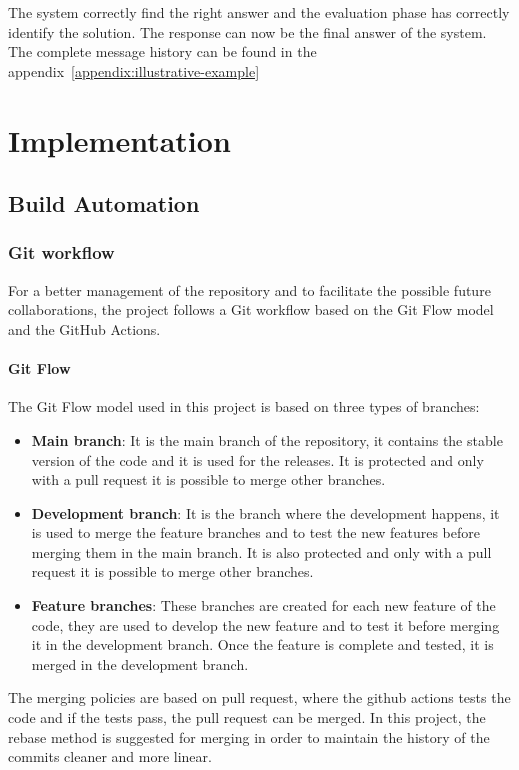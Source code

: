 \documentclass[12pt,a4paper,openright,twoside]{book}
\begin{document}
The system correctly find the right answer and the evaluation phase has correctly identify the solution. The response can now be the final answer of the system.
The complete message history can be found in the appendix~\ref{appendix:illustrative-example}

\chapter{Implementation}
\label{chap:implementation}
\section{Build Automation}
\subsection{Git workflow}
For a better management of the repository and to facilitate the possible future collaborations, the project follows a Git workflow based on the Git Flow model and the GitHub Actions. 
\subsubsection{Git Flow}
The Git Flow model used in this project is based on three types of branches:
\begin{itemize}
    \item \textbf{Main branch}: It is the main branch of the repository, it contains the stable version of the code and it is used for the releases. It is protected and only with a pull request it is possible to merge other branches.
    \item \textbf{Development branch}: It is the branch where the development happens, it is used to merge the feature branches and to test the new features before merging them in the main branch. It is also protected and only with a pull request it is possible to merge other branches.
    \item \textbf{Feature branches}: These branches are created for each new feature of the code, they are used to develop the new feature and to test it before merging it in the development branch. Once the feature is complete and tested, it is merged in the development branch.
\end{itemize}

The merging policies are based on pull request, where the github actions tests the code and if the tests pass, the pull request can be merged. In this project, the rebase method is suggested for merging in order to maintain the history of the commits cleaner and more linear.
\end{document}
